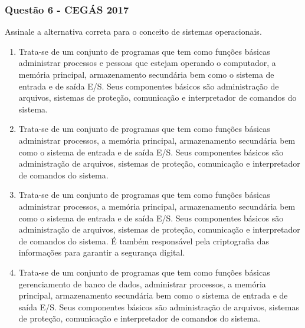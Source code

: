 \documentclass[aspectratio=169,
				xcolor=table]{beamer}
\begin{document}
	\begin{frame}
		\frametitle{Questão 6 - CEGÁS 2017}
		\vspace{-1.5em}
		Assinale a alternativa correta para o conceito de sistemas operacionais. 
		\begin{enumerate}[a]
			\scriptsize
			\item Trata-se de um conjunto de programas que tem como funções básicas administrar processos e pessoas que estejam operando o computador, a memória principal, armazenamento secundária bem como o sistema de entrada e de saída E/S. Seus componentes básicos são administração de arquivos, sistemas de proteção, comunicação e interpretador de comandos do sistema. 

			\item Trata-se de um conjunto de programas que tem como funções básicas administrar processos, a memória principal, armazenamento secundária bem como o sistema de entrada e de saída E/S. Seus componentes básicos são administração de arquivos, sistemas de proteção, comunicação e interpretador de comandos do sistema. 

			\item Trata-se de um conjunto de programas que tem como funções básicas administrar processos, a memória principal, armazenamento secundária bem como o sistema de entrada e de saída E/S. Seus componentes básicos são administração de arquivos, sistemas de proteção, comunicação e interpretador de comandos do sistema. É também responsável pela criptografia das informações para garantir a segurança digital. 

			\item Trata-se de um conjunto de programas que tem como funções básicas gerenciamento de banco de dados, administrar processos, a memória principal, armazenamento secundária bem como o sistema de entrada e de saída E/S. Seus componentes básicos são administração de arquivos, sistemas de proteção, comunicação e interpretador de comandos do sistema.
		\end{enumerate}


	\end{frame}
	
\end{document}
